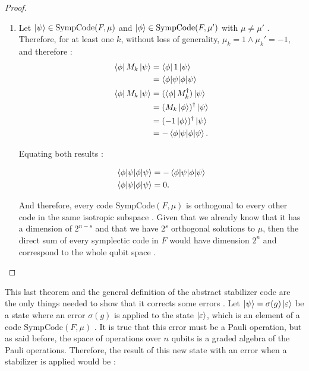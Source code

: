 \begin{theorem}
\begin{proof}
\begin{enumerate}
      And because for every non-identity Pauli operator $\text{Tr}(g) = 0$, the only important trace is $\text{Tr}(I) = 2^n$, and therefore \citep{Kitaev2002}:
      \begin{equation}
        \text{Tr}(P_\mu) = 2^{n - s}
        \label{eq:size_stabilizers}
      .\end{equation}
    \item Let $\ket{\psi} \in \text{SympCode}(F, \mu)$ and $\ket{\phi} \in \text{SympCode}(F, \mu')$ with $\mu \neq \mu'$ \citep{Cesar2024}. Therefore, for at least one $k$, without loss of generality, $\mu_k = 1 \land \mu_k' = -1$, and therefore \citep{Cesar2024}:
      \begin{align*}
        \bra{\phi}M_k\ket{\psi} &= \bra{\phi}1\ket{\psi}\\
        &= \braket{\phi | \psi}\\
        \bra{\phi}M_k\ket{\psi} &= (\bra{\phi}M_k^\dagger)\ket{\psi}\\
        &= (M_k\ket{\phi})^\dagger\ket{\psi}\\
        &= (-1\ket{\phi})^\dagger\ket{\psi}\\
        &= - \braket{\phi | \psi}
      .\end{align*}

      Equating both results \citep{Cesar2024}:

      \begin{align*}
        \braket{\phi | \psi} &= - \braket{\phi | \psi}\\
        \braket{\phi | \psi} &= 0
      .\end{align*}

      And therefore, every code $\text{SympCode}(F, \mu)$ is orthogonal to every other code in the same isotropic subspace \citep{Cesar2024}. Given that we already know that it has a dimension of $2^{n-s}$ and that we have $2^s$ orthogonal solutions to $\mu$, then the direct sum of every symplectic code in $F$ would have dimension $2^n$ and correspond to the whole qubit space \citep{Kitaev2002}.
  \end{enumerate}
\end{proof}
\end{theorem}

This last theorem and the general definition of the abstract stabilizer code are the only things needed to show that it corrects some errors \citep{Kitaev2002}. Let $\ket{\psi} = \sigma(g) \ket{\varepsilon}$ be a state where an error $\sigma(g)$ is applied to the state $\ket{\varepsilon}$, which is an element of a code $\text{SympCode}(F, \mu)$ \citep{Kitaev2002}. It is true that this error must be a Pauli operation, but as said before, the space of operations over $n$ qubits is a graded algebra of the Pauli operations. Therefore, the result of this new state with an error when a stabilizer is applied would be \citep{Kitaev2002}:

